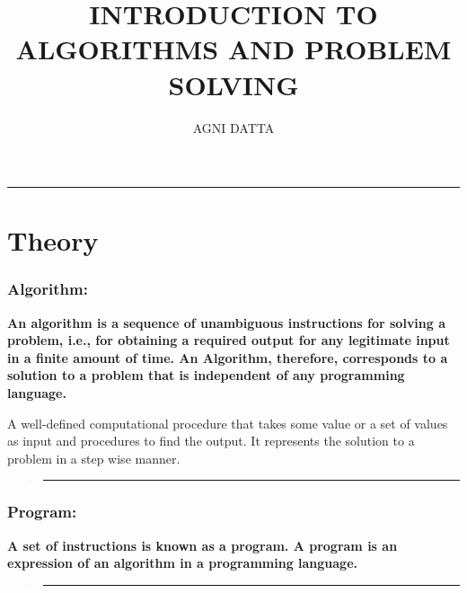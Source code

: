 \documentclass[10pt,british]{article}
\begin{document}
\title{\textbf{\huge{}INTRODUCTION TO ALGORITHMS AND PROBLEM SOLVING}}
\author{AGNI DATTA}
\maketitle
\begin{center}
\rule[0.5ex]{0.5\columnwidth}{0.5pt}
\par\end{center}

\pagebreak{}

\tableofcontents{}

\vfill{}

\pagebreak{}

\part{Theory}

\section{Algorithm:}

\textbf{An algorithm is a sequence of unambiguous instructions for
solving a problem, i.e., for obtaining a required output for any legitimate
input in a finite amount of time. An Algorithm, therefore, corresponds
to a solution to a problem that is independent of any programming
language.}

A well-defined computational procedure that takes some value or a
set of values as input and procedures to find the output. It represents
the solution to a problem in a step wise manner.
\begin{verse}
\rule[0.5ex]{1\columnwidth}{1pt} 
\end{verse}

\section{Program:}

\textbf{A set of instructions is known as a program. A program is
an expression of an algorithm in a programming language.}
\begin{verse}
\rule[0.5ex]{1\columnwidth}{1pt} 
\end{verse}
\end{document}
